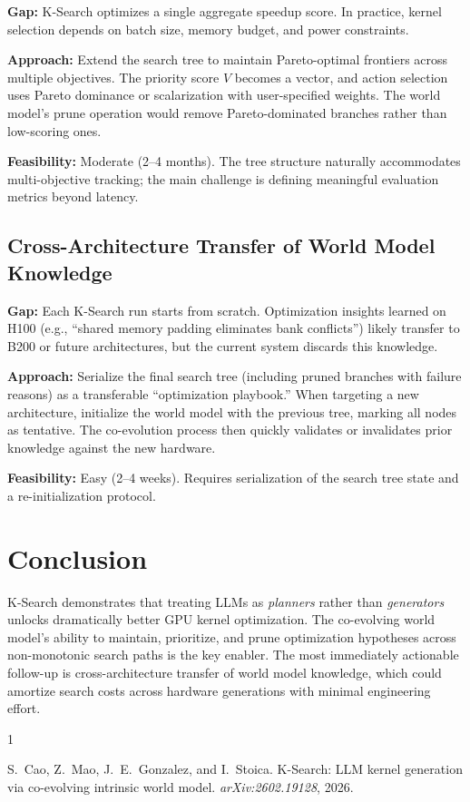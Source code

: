 \documentclass[11pt]{article}
\begin{document}
\textbf{Gap:} K-Search optimizes a single aggregate speedup score. In practice, kernel selection depends on batch size, memory budget, and power constraints.

\textbf{Approach:} Extend the search tree to maintain Pareto-optimal frontiers across multiple objectives. The priority score $V$ becomes a vector, and action selection uses Pareto dominance or scalarization with user-specified weights. The world model's prune operation would remove Pareto-dominated branches rather than low-scoring ones.

\textbf{Feasibility:} Moderate (2--4 months). The tree structure naturally accommodates multi-objective tracking; the main challenge is defining meaningful evaluation metrics beyond latency.

\subsection{Cross-Architecture Transfer of World Model Knowledge}

\textbf{Gap:} Each K-Search run starts from scratch. Optimization insights learned on H100 (e.g., ``shared memory padding eliminates bank conflicts'') likely transfer to B200 or future architectures, but the current system discards this knowledge.

\textbf{Approach:} Serialize the final search tree (including pruned branches with failure reasons) as a transferable ``optimization playbook.'' When targeting a new architecture, initialize the world model with the previous tree, marking all nodes as tentative. The co-evolution process then quickly validates or invalidates prior knowledge against the new hardware.

\textbf{Feasibility:} Easy (2--4 weeks). Requires serialization of the search tree state and a re-initialization protocol.

\section{Conclusion}

K-Search demonstrates that treating LLMs as \emph{planners} rather than \emph{generators} unlocks dramatically better GPU kernel optimization. The co-evolving world model's ability to maintain, prioritize, and prune optimization hypotheses across non-monotonic search paths is the key enabler. The most immediately actionable follow-up is cross-architecture transfer of world model knowledge, which could amortize search costs across hardware generations with minimal engineering effort.


\begin{thebibliography}{1}

S.~Cao, Z.~Mao, J.~E.~Gonzalez, and I.~Stoica.
\newblock K-Search: LLM kernel generation via co-evolving intrinsic world model.
\newblock \emph{arXiv:2602.19128}, 2026.

\end{thebibliography}
\end{document}
